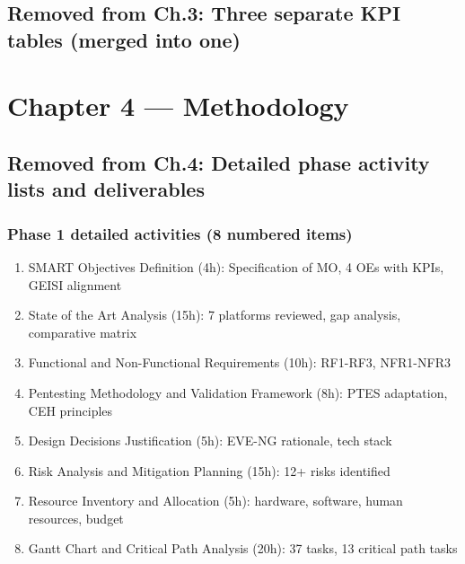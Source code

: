 \documentclass[a4paper,11pt]{article}
\begin{document}
\subsection{Removed from Ch.3: Three separate KPI tables (merged into one)}



\section{Chapter 4 --- Methodology}

\subsection{Removed from Ch.4: Detailed phase activity lists and deliverables}


\subsubsection{Phase 1 detailed activities (8 numbered items)}
\begin{enumerate}
\item SMART Objectives Definition (4h): Specification of MO, 4 OEs with KPIs, GEISI alignment
\item State of the Art Analysis (15h): 7 platforms reviewed, gap analysis, comparative matrix
\item Functional and Non-Functional Requirements (10h): RF1-RF3, NFR1-NFR3
\item Pentesting Methodology and Validation Framework (8h): PTES adaptation, CEH principles
\item Design Decisions Justification (5h): EVE-NG rationale, tech stack
\item Risk Analysis and Mitigation Planning (15h): 12+ risks identified
\item Resource Inventory and Allocation (5h): hardware, software, human resources, budget
\item Gantt Chart and Critical Path Analysis (20h): 37 tasks, 13 critical path tasks
\end{enumerate}
\end{document}

